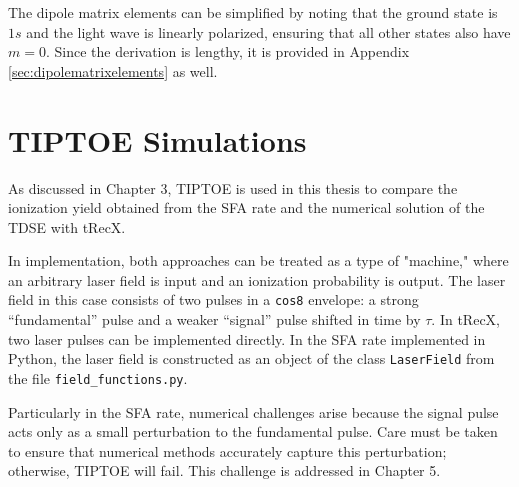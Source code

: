 The dipole matrix elements can be simplified by noting that the ground state is $1s$ and the light wave is linearly polarized, ensuring that all other states also have $m=0$. Since the derivation is lengthy, it is provided in Appendix \ref{sec:dipolematrixelements} as well.

\section{TIPTOE Simulations}
As discussed in Chapter 3, TIPTOE is used in this thesis to compare the ionization yield obtained from the SFA rate and the numerical solution of the TDSE with tRecX.

In implementation, both approaches can be treated as a type of "machine," where an arbitrary laser field is input and an ionization probability is output. The laser field in this case consists of two pulses in a \texttt{cos8} envelope: a strong ``fundamental'' pulse and a weaker ``signal'' pulse shifted in time by $\tau$. 
In tRecX, two laser pulses can be implemented directly. In the SFA rate implemented in Python, the laser field is constructed as an object of the class \texttt{LaserField} from the file \texttt{field\_functions.py}.

Particularly in the SFA rate, numerical challenges arise because the signal pulse acts only as a small perturbation to the fundamental pulse. Care must be taken to ensure that numerical methods accurately capture this perturbation; otherwise, TIPTOE will fail. This challenge is addressed in Chapter 5.